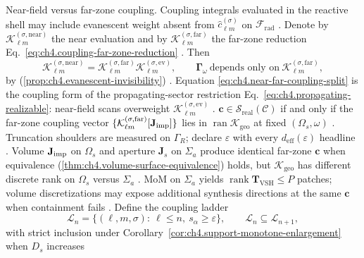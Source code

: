 Near-field versus far-zone coupling. Coupling integrals evaluated in the reactive shell may include evanescent weight absent from
\(\widehat{c}_{\ell m}^{(\sigma)}\) on \(\mathcal{F}_{\mathrm{rad}}\) \cite{stratton1941}. Denote by
\(\mathcal{K}_{\ell m}^{(\sigma,\mathrm{near})}\) the near evaluation and by
\(\mathcal{K}_{\ell m}^{(\sigma,\mathrm{far})}\) the far-zone reduction
Eq.~\eqref{eq:ch4.coupling-far-zone-reduction} \cite{devaney2004}. Then
\begin{equation}
\label{eq:ch4.near-far-coupling-split}
\mathcal{K}_{\ell m}^{(\sigma,\mathrm{near})}
=
\mathcal{K}_{\ell m}^{(\sigma,\mathrm{far})}
\mathcal{K}_{\ell m}^{(\sigma,\mathrm{ev})},
\qquad
\boldsymbol{\Gamma}_\omega\ \text{depends only on}\ 
\mathcal{K}_{\ell m}^{(\sigma,\mathrm{far})},
\end{equation}
by (\ref{prop:ch4.evanescent-invisibility}) \cite{stratton1941}. Equation
\eqref{eq:ch4.near-far-coupling-split} is the coupling form of the propagating-sector restriction
Eq.~\eqref{eq:ch4.propagating-realizable}: near-field scans overweight
\(\mathcal{K}_{\ell m}^{(\sigma,\mathrm{ev})}\) \cite{devaney2004}.
\phantomsection\label{cor:ch4.far-coupling-synthesis}
\(\mathbf{c}\in\mathcal{S}_{\mathrm{real}}(\mathcal{C})\) if and only if the far-zone coupling vector
\(\{\mathcal{K}_{\ell m}^{(\sigma,\mathrm{far})}[\mathbf{J}_{\mathrm{imp}}]\}\) lies in \(\operatorname{ran}\boldsymbol{\mathcal{K}}_{\mathrm{geo}}\)
at fixed \((\Omega_{s},\omega)\) \cite{stratton1941}.
Truncation shoulders are measured on $\Gamma_R$; declare $\varepsilon$ with every $d_{\mathrm{eff}}(\varepsilon)$ headline \cite{poynting1884}.
Volume \(\mathbf{J}_{\mathrm{imp}}\) on \(\Omega_{s}\) and aperture \(\mathbf{J}_{s}\) on \(\Sigma_{a}\) produce identical far-zone
\(\mathbf{c}\) when equivalence (\ref{thm:ch4.volume-surface-equivalence}) holds, but
\(\boldsymbol{\mathcal{K}}_{\mathrm{geo}}\) has different discrete rank on \(\Omega_{s}\) versus \(\Sigma_{a}\)
\cite{collin2001}. MoM on \(\Sigma_{a}\) yields
\(\operatorname{rank}\mathbf{T}_{\mathrm{VSH}}\le P\) patches; volume discretizations may expose additional synthesis
directions at the same \(\mathbf{c}\) when containment fails \cite{devaney2004}.
Define the coupling ladder
\begin{equation}
\label{eq:ch4.coupling-ladder}
\mathcal{L}_{n}
=
\big\{(\ell,m,\sigma):\ \ell\le n,\ s_{\alpha}\ge\varepsilon\big\},
\qquad
\mathcal{L}_{n}\subseteq\mathcal{L}_{n+1},
\end{equation}
with strict inclusion under Corollary~\ref{cor:ch4.support-monotone-enlargement} when \(D_{s}\) increases
